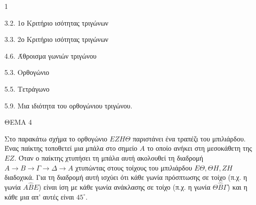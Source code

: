 \begin{ylh}{1}
    \item 3.2. 1ο Κριτήριο ισότητας τριγώνων
    \item 3.3. 2ο Κριτήριο ισότητας τριγώνων
    \item 4.6. Άθροισμα γωνιών τριγώνου
    \item 5.3. Ορθογώνιο
    \item 5.5. Τετράγωνο
    \item 5.9. Μια ιδιότητα του ορθογώνιου τριγώνου.
\end{ylh}

ΘΕΜΑ 4

Στο παρακάτω σχήμα το ορθογώνιο $E Z H \Theta$ παριστάνει ένα τραπέζι του μπιλιάρδου. Ένας παίκτης τοποθετεί μια μπάλα στο σημείο $A$ το οποίο ανήκει στη μεσοκάθετη της $EZ$. Όταν ο παίκτης χτυπήσει τη μπάλα αυτή ακολουθεί τη διαδρομή $A \rightarrow B \rightarrow \Gamma \rightarrow \Delta \rightarrow A$ χτυπώντας στους τοίχους του μπιλιάρδου $E\Theta, \Theta H, ZH$ διαδοχικά. Για τη διαδρομή αυτή ισχύει ότι κάθε γωνία πρόσπτωσης σε τοίχο (π.χ. η γωνία $A\widehat{B}E$) είναι ίση με κάθε γωνία ανάκλασης σε τοίχο (π.χ. η γωνία $\Theta\widehat{B}\Gamma$) και η κάθε μια απ' αυτές είναι $45^{\circ}$.

